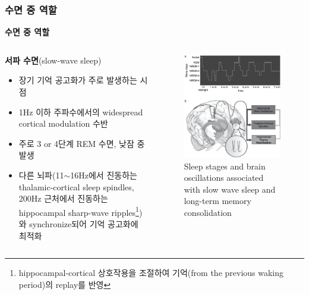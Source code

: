 \documentclass{beamer}
\begin{document}
\subsubsection{수면 중 역할}
\begin{frame}{\textbf{수면 중 역할}}
  \begin{columns}
    \begin{column}{0.58\textwidth}
      \textbf{서파 수면}(slow-wave sleep)
      \begin{itemize}
        \item 장기 기억 공고화가 주로 발생하는 시점
        \item 1Hz 이하 주파수에서의 widespread cortical modulation 수반
        \item 주로 3 or 4단계 REM 수면, 낮잠 중 발생
        \item 다른 뇌파(11$\sim$16Hz에서 진동하는 thalamic-cortical sleep spindles, 200Hz 근처에서 진동하는 hippocampal sharp-wave ripples\footnote{hippocampal-cortical 상호작용을 조절하여 기억(from the previous waking period)의 replay를 반영})와 synchronize되어 기억 공고화에 최적화
      \end{itemize}
    \end{column}
    \hfill
    \begin{column}{0.42\textwidth}
      \begin{figure}
        \centering
        \includegraphics[width=\textwidth]{image/sleep_stages}
        \caption{Sleep stages and brain oscillations associated with slow wave sleep and long-term memory consolidation}
      \end{figure}
    \end{column}
  \end{columns}
\end{frame}
\end{document}
